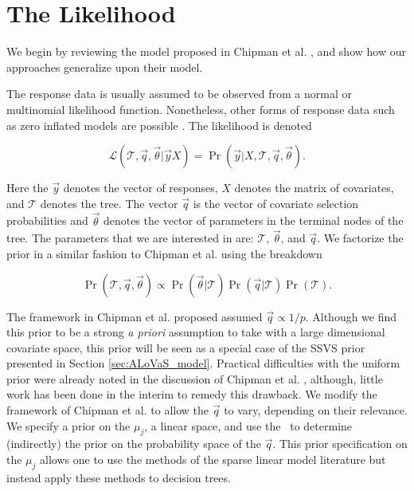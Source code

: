 	\section{The Likelihood}\label{sec:lhood}

We begin by reviewing the model proposed in Chipman et al. \cite{chipman1998bayesian}, and show how our approaches generalize upon their model. 

The response data is usually assumed to be observed from a normal or multinomial likelihood function. Nonetheless, other forms of response data such as zero inflated models are possible \cite{Roberts:2014fk}. The likelihood is denoted 

\begin{equation}\label{eqn:cgm_likelihood}
\mathcal{L}(\mathcal{T}, \vec{q}, \vec{\theta} \vert \vec{y} X)=\Pr(\vec{y} \vert X, \mathcal{T}, \vec{q}, \vec{\theta}).
\end{equation} 
		
\noindent Here the $\vec{y}$ denotes the vector of responses, $X$ denotes the matrix of covariates, and $\mathcal{T}$ denotes the tree. The vector $\vec{q}$ is the vector of covariate selection probabilities and $\vec{\theta}$ denotes the vector of parameters in the terminal nodes of the tree. The parameters that we are interested in are: $\mathcal{T}$, $\vec{\theta}$, and $\vec{q}$. We factorize the prior in a similar fashion to Chipman et al. using the breakdown 

\begin{equation}\label{eqn:prior}
\Pr(\mathcal{T}, \vec{q}, \vec{\theta}) \propto \Pr(\vec{\theta} \vert \mathcal{T}) \Pr(\vec{q} \vert \mathcal{T})\Pr(\mathcal{T}).
\end{equation} 

The framework in Chipman et al. \cite{chipman1998bayesian} proposed assumed $\vec{q} \propto 1/p$. Although we find this prior to be a strong \emph{a priori} assumption to take with a large dimensional covariate space, this prior will be seen as a special case of the SSVS prior presented in Section \ref{sec:ALoVaS_model}. Practical difficulties with the uniform prior were already noted in the discussion of Chipman et al. \cite{knight1998bayesian}, although, little work has been done in the interim to remedy this drawback. We modify the framework of Chipman et al. to allow the $\vec{q}$ to vary, depending on their relevance. We specify a prior on the $\mu_j$, a linear space, and use the \ALT\ to determine (indirectly) the prior on the probability space of the $\vec{q}$. This prior specification on the $\mu_j$ allows one to use the methods of the sparse linear model literature but instead apply these methods to decision trees. 

